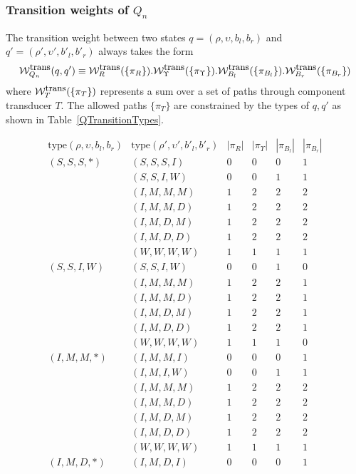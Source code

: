\documentclass{article}
\newcommand\idfork{\Upsilon}
\newcommand\weight{{\cal W}}
\newcommand\weightfunof[1]{\weight_{#1}}
\newcommand\transweightfun[1]{\weightfunof{#1}^{\mbox{\small trans}}}
\newcommand\sumoverpaths[1]{\transweightfun{#1}(\{\pi_{#1}\})}
\newcommand\statetype{\mbox{type}}
\newcommand\qstate{(\rho,\upsilon,b_l,b_r)}
\newcommand\qstatedest{(\rho',\upsilon',b'_l,b'_r)}
\begin{document}
\subsubsection{Transition weights of $Q_n$}
The transition weight between two states
$q=\qstate$ and
$q'=\qstatedest$
always takes the form
\[
\transweightfun{Q_n}(q,q') \equiv \sumoverpaths{R} . \sumoverpaths{\idfork} . \sumoverpaths{B_l} . \sumoverpaths{B_r}
\]
where $\sumoverpaths{T}$ represents a sum over a set of paths through component transducer $T$.
The allowed paths $\{\pi_T\}$ are constrained by the types of $q,q'$ as shown in Table~\ref{QTransitionTypes}.
\begin{table}
\[
\begin{array}{ll|cccc}
\statetype\qstate & \statetype\qstatedest & |\pi_R| & |\pi_{\idfork}| & |\pi_{B_l}| & |\pi_{B_r}| \\
\hline
(S,S,S,*) & (S,S,S,I) & 0 & 0 & 0 & 1 \\
          & (S,S,I,W) & 0 & 0 & 1 & 1 \\
          & (I,M,M,M) & 1 & 2 & 2 & 2 \\
          & (I,M,M,D) & 1 & 2 & 2 & 2 \\
          & (I,M,D,M) & 1 & 2 & 2 & 2 \\
          & (I,M,D,D) & 1 & 2 & 2 & 2 \\
          & (W,W,W,W) & 1 & 1 & 1 & 1 \\
\hline
(S,S,I,W) & (S,S,I,W) & 0 & 0 & 1 & 0 \\
          & (I,M,M,M) & 1 & 2 & 2 & 1 \\
          & (I,M,M,D) & 1 & 2 & 2 & 1 \\
          & (I,M,D,M) & 1 & 2 & 2 & 1 \\
          & (I,M,D,D) & 1 & 2 & 2 & 1 \\
          & (W,W,W,W) & 1 & 1 & 1 & 0 \\
\hline
(I,M,M,*) & (I,M,M,I) & 0 & 0 & 0 & 1 \\
          & (I,M,I,W) & 0 & 0 & 1 & 1 \\
          & (I,M,M,M) & 1 & 2 & 2 & 2 \\
          & (I,M,M,D) & 1 & 2 & 2 & 2 \\
          & (I,M,D,M) & 1 & 2 & 2 & 2 \\
          & (I,M,D,D) & 1 & 2 & 2 & 2 \\
          & (W,W,W,W) & 1 & 1 & 1 & 1 \\
\hline
(I,M,D,*) & (I,M,D,I) & 0 & 0 & 0 & 1 \\

\end{array}\]
\end{table}
\end{document}
